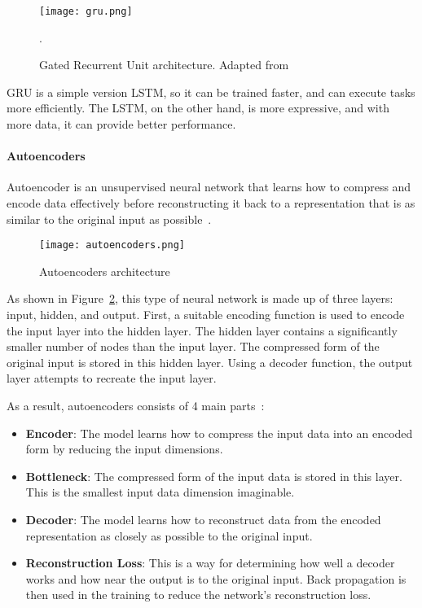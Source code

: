 \begin{figure}[htbp]
    \centering
    \texttt{[image: gru.png]}
    \caption{Gated Recurrent Unit architecture. Adapted from~\cite{Madhavan2021DeepDeveloper}}.
    \label{fig:gru}
\end{figure}

\gls{GRU} is a simple version \gls{LSTM}, so it can be trained faster, and can execute tasks more efficiently. The \gls{LSTM}, on the other hand, is more expressive, and with more data, it can provide better performance.

\paragraph{Autoencoders}

Autoencoder is an unsupervised neural network that learns how to compress and encode data effectively before reconstructing it back to a representation that is as similar to the original input as possible~\cite{LopezPinaya2020Autoencoders}.

\begin{figure}[htbp]
    \centering
    \texttt{[image: autoencoders.png]}
    \caption{Autoencoders architecture~\cite{Madhavan2021DeepDeveloper}}
    \label{fig:autoencoders}
\end{figure}

As shown in Figure~\ref{fig:autoencoders}, this type of neural network is made up of three layers: input, hidden, and output. First, a suitable encoding function is used to encode the input layer into the hidden layer. The hidden layer contains a significantly smaller number of nodes than the input layer. The compressed form of the original input is stored in this hidden layer. Using a decoder function, the output layer attempts to recreate the input layer. 

As a result, autoencoders consists of 4 main parts~\cite{Abirami2020Energy-efficientSystem,LopezPinaya2020Autoencoders}:

\begin{itemize}
    \item \textbf{Encoder}: The model learns how to compress the input data into an encoded form by reducing the input dimensions.
    \item \textbf{Bottleneck}: The compressed form of the input data is stored in this layer. This is the smallest input data dimension imaginable.
    \item \textbf{Decoder}: The model learns how to reconstruct data from the encoded representation as closely as possible to the original input.
    \item \textbf{Reconstruction Loss}: This is a way for determining how well a decoder works and how near the output is to the original input. Back propagation is then used in the training to reduce the network's reconstruction loss.
\end{itemize}

